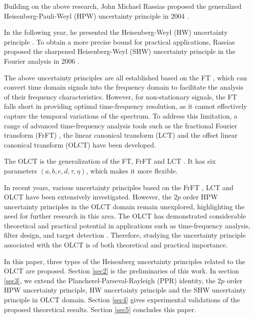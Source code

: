 \documentclass[preprint,12pt]{elsarticle}
\begin{document}
Building on the above research, John Michael Rassias proposed the generalized Heisenberg-Pauli-Weyl (HPW) uncertainty principle in 2004 \cite{HPW}.

In the following year, he presented the Heisenberg-Weyl (HW)  uncertainty principle \cite{HW}. To obtain a more precise bound for practical applications, Rassias proposed the sharpened Heisenberg-Weyl (SHW) uncertainty principle in the Fourier analysis in 2006 \cite{SHW}.

The above uncertainty principles are all established based on the FT \cite{FT,FT2,FT3}, which can convert time domain signals into the frequency domain to facilitate the analysis of their frequency characteristics. However, for non-stationary signals, the FT falls short in providing optimal time-frequency resolution, as it cannot effectively capture the temporal variations of the spectrum. To address this limitation, a range of advanced time-frequency analysis tools such as the fractional Fourier transform (FrFT) \cite{FrFt, FrFt2, FrFt3}, the linear canonical transform (LCT) \cite{LCT, LCT2} and the offset linear canonical transform (OLCT) have been developed. 

The OLCT is the generalization of the FT, FrFT and LCT \cite{OLCT, OLCTtwo}. It has six parameters $(a, b, c, d, \tau, \eta)$, which makes it more flexible. 

In recent years, various uncertainty principles based on the FrFT \cite{FrFtUN, FrFtUN2, FrFtDP}, LCT \cite{LCTUN, DB, UPDP} and OLCT \cite{OLCTUN1, OLCTUN2, OLCTUN3} have been extensively investigated. However, the $2p$ order HPW uncertainty principles in the OLCT domain remain unexplored, highlighting the need for further research in this area. The OLCT has demonstrated considerable theoretical and practical potential in applications such as time-frequency analysis, filter design, and target detection \cite{OLCTthree}. Therefore, studying the uncertainty principle associated with the OLCT is of both theoretical and practical importance.

In this paper, three types of the Heisenberg uncertainty principles related to the OLCT are proposed. Section \ref{sec2} is the preliminaries of this work. In section \ref{sec3}, we extend the Plancherel-Parseval-Rayleigh (PPR) identity,  the $2p$ order HPW uncertainty principle, HW uncertainty principle and the SHW uncertainty principle in OLCT domain. Section \ref{sec4} gives experimental validations of the proposed theoretical results. Section \ref{sec5} concludes this paper.
\end{document}
